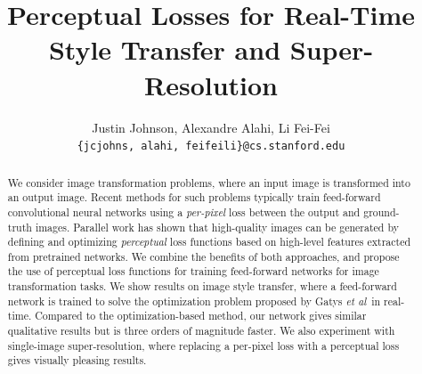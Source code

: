 \documentclass[runningheads]{llncs}
\newcommand{\etal}{\textit{et al}}
\begin{document}
\pagestyle{headings}
\mainmatter
\def\ECCV16SubNumber{442}  %

\title{Perceptual Losses for Real-Time Style Transfer and Super-Resolution}


\authorrunning{Johnson \etal}

\author{Justin Johnson, Alexandre Alahi, Li Fei-Fei \\
  {\tt\small\{jcjohns, alahi, feifeili\}@cs.stanford.edu}}


\maketitle

\begin{abstract}
We consider image transformation problems, where an input image is transformed into an
output image. Recent methods for such problems typically train feed-forward convolutional
neural networks using a \emph{per-pixel} loss between the output and ground-truth images.
Parallel work has shown that high-quality images can be generated by defining and optimizing
\emph{perceptual} loss functions based on high-level features extracted from pretrained
networks. We combine the benefits of both approaches, and propose the use of perceptual
loss functions for training feed-forward networks for image transformation tasks. We show
results on image
style transfer, where a feed-forward network is trained to solve the optimization
problem proposed by Gatys \etal~in real-time. Compared to the optimization-based method, our
network gives similar qualitative results but is three orders of magnitude faster.
We also experiment with single-image super-resolution, where replacing
a per-pixel loss with a perceptual loss gives visually pleasing results.
\end{abstract}
\end{document}

